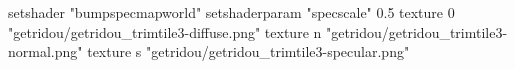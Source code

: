 setshader "bumpspecmapworld"
setshaderparam "specscale" 0.5
texture 0 "getridou/getridou_trimtile3-diffuse.png"
texture n "getridou/getridou_trimtile3-normal.png"
texture s "getridou/getridou_trimtile3-specular.png"
